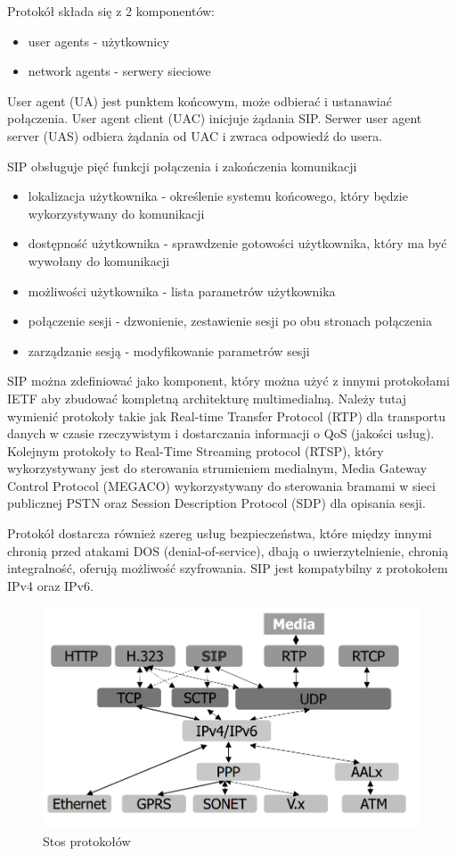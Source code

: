 Protokół składa się z 2 komponentów:

\begin{itemize}
	\item user agents - użytkownicy
	\item network agents - serwery sieciowe
\end{itemize}
User agent (UA) jest punktem końcowym, może odbierać i ustanawiać połączenia. User agent client (UAC) inicjuje żądania SIP. Serwer user agent server (UAS) odbiera żądania od UAC i zwraca odpowiedź do usera. 

SIP obsługuje pięć funkcji połączenia i zakończenia komunikacji

\begin{itemize}
	\item lokalizacja użytkownika - określenie systemu końcowego, który będzie wykorzystywany do komunikacji
	\item dostępność użytkownika - sprawdzenie gotowości użytkownika, który ma być wywołany do komunikacji
	\item możliwości użytkownika - lista parametrów użytkownika 
	\item połączenie sesji - dzwonienie, zestawienie sesji po obu stronach połączenia
	\item zarządzanie sesją - modyfikowanie parametrów sesji
	
\end{itemize}

SIP można zdefiniować jako komponent, który można użyć z innymi protokołami IETF aby zbudować kompletną architekturę multimedialną. Należy tutaj wymienić protokoły takie jak Real-time Transfer Protocol (RTP) dla transportu danych w czasie rzeczywistym i dostarczania informacji o QoS (jakości usług). Kolejnym protokoły to Real-Time Streaming protocol (RTSP), który wykorzystywany jest do sterowania strumieniem medialnym, Media Gateway Control Protocol (MEGACO) wykorzystywany do sterowania bramami w sieci publicznej PSTN oraz Session Description Protocol (SDP) dla opisania sesji.

Protokół dostarcza również szereg usług bezpieczeństwa, które między innymi chronią przed atakami DOS (denial-of-service), dbają o uwierzytelnienie, chronią integralność, oferują możliwość szyfrowania. SIP jest kompatybilny z protokołem IPv4 oraz IPv6.

\begin{figure}[H]
	\centering
	\includegraphics[width=0.7\linewidth]{sip_stos_proto}
	\caption{Stos protokołów}
	\label{fig:sip_stos_proto}
\end{figure}

